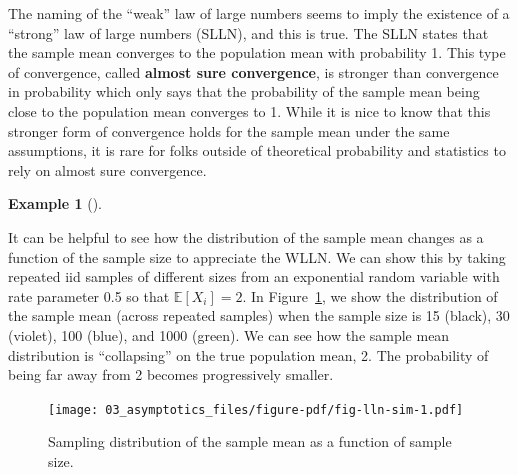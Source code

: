 \documentclass[
  letterpaper,
  DIV=11,
  numbers=noendperiod]{scrreprt}
\newcommand{\E}{\mathbb{E}}
\theoremstyle{definition}
\theoremstyle{plain}
\theoremstyle{definition}
\newtheorem{example}{Example}[chapter]
\theoremstyle{remark}
\begin{document}
\begin{tcolorbox}[enhanced jigsaw, opacitybacktitle=0.6, bottomrule=.15mm, colback=white, colframe=quarto-callout-note-color-frame, arc=.35mm, opacityback=0, breakable, leftrule=.75mm, titlerule=0mm, left=2mm, rightrule=.15mm, toptitle=1mm, bottomtitle=1mm, toprule=.15mm, title=\textcolor{quarto-callout-note-color}{\faInfo}\hspace{0.5em}{Note}, colbacktitle=quarto-callout-note-color!10!white, coltitle=black]

The naming of the ``weak'' law of large numbers seems to imply the
existence of a ``strong'' law of large numbers (SLLN), and this is true.
The SLLN states that the sample mean converges to the population mean
with probability 1. This type of convergence, called \textbf{almost sure
convergence}, is stronger than convergence in probability which only
says that the probability of the sample mean being close to the
population mean converges to 1. While it is nice to know that this
stronger form of convergence holds for the sample mean under the same
assumptions, it is rare for folks outside of theoretical probability and
statistics to rely on almost sure convergence.

\end{tcolorbox}

\begin{example}[]\protect\hypertarget{exm-lln}{}\label{exm-lln}

It can be helpful to see how the distribution of the sample mean changes
as a function of the sample size to appreciate the WLLN. We can show
this by taking repeated iid samples of different sizes from an
exponential random variable with rate parameter 0.5 so that
\(\E[X_i] = 2\). In Figure~\ref{fig-lln-sim}, we show the distribution
of the sample mean (across repeated samples) when the sample size is 15
(black), 30 (violet), 100 (blue), and 1000 (green). We can see how the
sample mean distribution is ``collapsing'' on the true population mean,
2. The probability of being far away from 2 becomes progressively
smaller.

\begin{figure}

{\centering \texttt{[image: 03\_asymptotics\_files/figure-pdf/fig-lln-sim-1.pdf]}

}

\caption{\label{fig-lln-sim}Sampling distribution of the sample mean as
a function of sample size.}

\end{figure}

\end{example}
\end{document}
